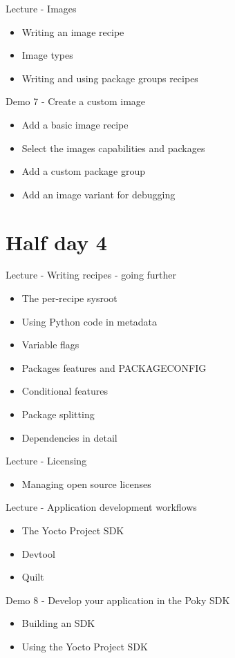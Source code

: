 \documentclass[a4paper,12pt,obeyspaces,spaces,hyphens]{article}
\begin{document}
\feagendatwocolumn
{Lecture - Images}
{
  \begin{itemize}
  \item Writing an image recipe
  \item Image types
  \item Writing and using package groups recipes
  \end{itemize}
}
{Demo 7 - Create a custom image}
{
  \begin{itemize}
  \item Add a basic image recipe
  \item Select the images capabilities and packages
  \item Add a custom package group
  \item Add an image variant for debugging
  \end{itemize}
}

\section{Half day 4}

\feagendatwocolumn
{Lecture - Writing recipes - going further}
{
  \begin{itemize}
  \item The per-recipe sysroot
  \item Using Python code in metadata
  \item Variable flags
  \item Packages features and PACKAGECONFIG
  \item Conditional features
  \item Package splitting
  \item Dependencies in detail
  \end{itemize}
}
{Lecture - Licensing}
{
  \begin{itemize}
  \item Managing open source licenses
  \end{itemize}
}

\feagendatwocolumn
{Lecture - Application development workflows}
{
  \begin{itemize}
  \item The Yocto Project SDK
  \item Devtool
  \item Quilt
  \end{itemize}
}
{Demo 8 - Develop your application in the Poky SDK}
{
  \begin{itemize}
  \item Building an SDK
  \item Using the Yocto Project SDK
  \end{itemize}
}
\end{document}
